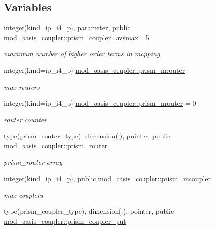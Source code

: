\subsection*{Variables}
\begin{DoxyCompactItemize}
\item 
integer(kind=ip\+\_\+i4\+\_\+p), parameter, public \hyperlink{namespacemod__oasis__coupler_a6f166f099a134dffba97a168d28a3c01}{mod\+\_\+oasis\+\_\+coupler\+::prism\+\_\+coupler\+\_\+avsmax} =5
\begin{DoxyCompactList}\small\item\em maximum number of higher order terms in mapping \end{DoxyCompactList}\item 
integer(kind=ip\+\_\+i4\+\_\+p) \hyperlink{namespacemod__oasis__coupler_a6d46883e9df70ab9cdafaf607afacacb}{mod\+\_\+oasis\+\_\+coupler\+::prism\+\_\+mrouter}
\begin{DoxyCompactList}\small\item\em max routers \end{DoxyCompactList}\item 
integer(kind=ip\+\_\+i4\+\_\+p) \hyperlink{namespacemod__oasis__coupler_a2ebdb255598e1b004de2533f16b06e04}{mod\+\_\+oasis\+\_\+coupler\+::prism\+\_\+nrouter} = 0
\begin{DoxyCompactList}\small\item\em router counter \end{DoxyCompactList}\item 
type(prism\+\_\+router\+\_\+type), dimension(\+:), pointer, public \hyperlink{namespacemod__oasis__coupler_a33dbf692ad73f83f73fe083e252badd8}{mod\+\_\+oasis\+\_\+coupler\+::prism\+\_\+router}
\begin{DoxyCompactList}\small\item\em prism\+\_\+router array \end{DoxyCompactList}\item 
integer(kind=ip\+\_\+i4\+\_\+p), public \hyperlink{namespacemod__oasis__coupler_aaa019c39b0f657e7c37820697ecf354a}{mod\+\_\+oasis\+\_\+coupler\+::prism\+\_\+mcoupler}
\begin{DoxyCompactList}\small\item\em max couplers \end{DoxyCompactList}\item 
type(prism\+\_\+coupler\+\_\+type), dimension(\+:), pointer, public \hyperlink{namespacemod__oasis__coupler_ae59d8823993d9ca8610efd9770393271}{mod\+\_\+oasis\+\_\+coupler\+::prism\+\_\+coupler\+\_\+put}

\end{DoxyCompactItemize}
